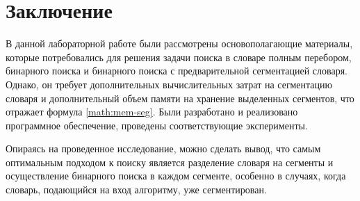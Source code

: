 \chapter*{Заключение}
В данной лабораторной работе были рассмотрены основополагающие материалы, которые потребовались для решения задачи поиска в словаре полным перебором, бинарного поиска и бинарного поиска с предварительной сегментацией словаря. Однако, он требует дополнительных вычислительных затрат на сегментацию словаря и дополнительный объем памяти на хранение выделенных сегментов, что отражает формула \ref{math:mem-seg}. Были разработано и реализовано программное обеспечение, проведены соответствующие эксперименты.

Опираясь на проведенное исследование, можно сделать вывод, что самым оптимальным подходом к поиску является разделение словаря на сегменты и осуществление бинарного поиска в каждом сегменте, особенно в случаях, когда словарь, подающийся на вход алгоритму, уже сегментирован.
